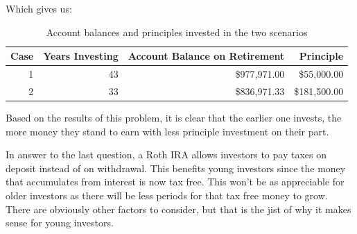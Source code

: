 \documentclass[letterpaper]{report}
\begin{document}
\pagebreak
Which gives us:
\begin{table}[h]
	\centering
	\begin{tabular}{|r|r|r|r|}
		\hline 
		Case & Years Investing & Account Balance on Retirement & Principle \\ 
		\hline 
		1 & 43 & \$977,971.00 & \$55,000.00 \\ 
		\hline 
		2 & 33 & \$836,971.33 & \$181,500.00 \\ 
		\hline 
	\end{tabular} 
	\caption[]{Account balances and principles invested in the two scenarios}
\end{table}

Based on the results of this problem, it is clear that the earlier one invests, the more money they stand to earn with less principle investment on their part.

In answer to the last question, a Roth IRA allows investors to pay taxes on deposit instead of on withdrawal. This benefits young investors since the money that accumulates from interest is now tax free. This won't be as appreciable for older investors as there will be less periods for that tax free money to grow. There are obviously other factors to consider, but that is the jist of why it makes sense for young investors.
\end{document}
